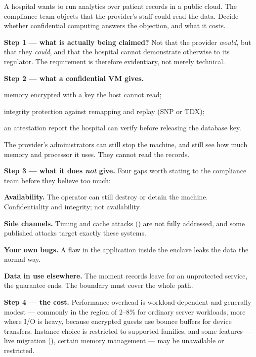 \begin{worked}
A hospital wants to run analytics over patient records in a public cloud. The
compliance team objects that the provider's staff could read the data. Decide
whether confidential computing answers the objection, and what it costs.

\smallskip
\textbf{Step 1 --- what is actually being claimed?} Not that the provider
\emph{would}, but that they \emph{could}, and that the hospital cannot
demonstrate otherwise to its regulator. The requirement is therefore
evidentiary, not merely technical.

\smallskip
\textbf{Step 2 --- what a confidential VM gives.}
\begin{tight}
  \item memory encrypted with a key the host cannot read;
  \item integrity protection against remapping and replay (SNP or TDX);
  \item an attestation report the hospital can verify before releasing the
        database key.
\end{tight}
The provider's administrators can still stop the machine, and still see how
much memory and processor it uses. They cannot read the records.

\smallskip
\textbf{Step 3 --- what it does \emph{not} give.} Four gaps worth stating to
the compliance team before they believe too much:
\begin{tight}
  \item \textbf{Availability.} The operator can still destroy or detain the
        machine. Confidentiality and integrity; not availability.
  \item \textbf{Side channels.} Timing and cache attacks
        () are not fully addressed, and some published attacks
        target exactly these systems.
  \item \textbf{Your own bugs.} A flaw in the application inside the enclave
        leaks the data the normal way.
  \item \textbf{Data in use elsewhere.} The moment records leave for an
        unprotected service, the guarantee ends. The boundary must cover the
        whole path.
\end{tight}

\smallskip
\textbf{Step 4 --- the cost.} Performance overhead is workload-dependent and
generally modest --- commonly in the region of 2--8\% for ordinary server
workloads, more where I/O is heavy, because encrypted guests use bounce buffers
for device transfers. Instance choice is restricted to supported families, and
some features --- live migration (), certain memory management
--- may be unavailable or restricted.


\end{worked}

